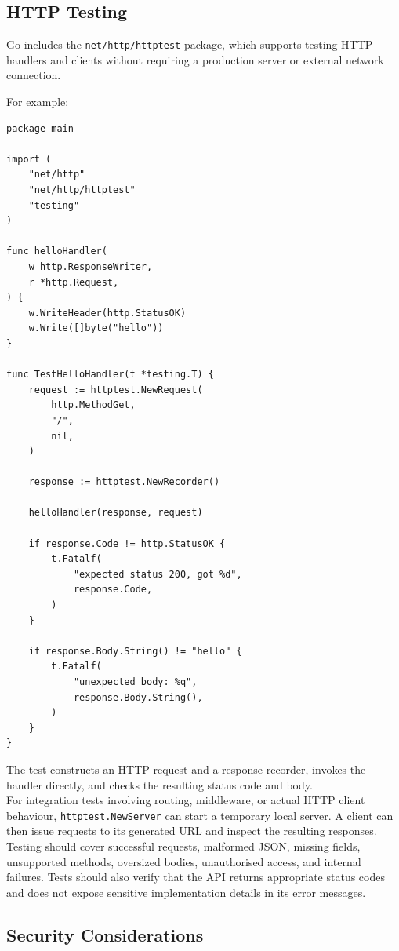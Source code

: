 \subsection{HTTP Testing}

Go includes the \texttt{net/http/httptest} package, which supports testing HTTP handlers and clients without requiring a production server or external network connection.

For example:

\begin{lstlisting}
package main

import (
    "net/http"
    "net/http/httptest"
    "testing"
)

func helloHandler(
    w http.ResponseWriter,
    r *http.Request,
) {
    w.WriteHeader(http.StatusOK)
    w.Write([]byte("hello"))
}

func TestHelloHandler(t *testing.T) {
    request := httptest.NewRequest(
        http.MethodGet,
        "/",
        nil,
    )

    response := httptest.NewRecorder()

    helloHandler(response, request)

    if response.Code != http.StatusOK {
        t.Fatalf(
            "expected status 200, got %d",
            response.Code,
        )
    }

    if response.Body.String() != "hello" {
        t.Fatalf(
            "unexpected body: %q",
            response.Body.String(),
        )
    }
}
\end{lstlisting}

The test constructs an HTTP request and a response recorder, invokes the handler directly, and checks the resulting status code and body.\\

For integration tests involving routing, middleware, or actual HTTP client behaviour, \texttt{httptest.NewServer} can start a temporary local server. A client can then issue requests to its generated URL and inspect the resulting responses.\\

Testing should cover successful requests, malformed JSON, missing fields, unsupported methods, oversized bodies, unauthorised access, and internal failures. Tests should also verify that the API returns appropriate status codes and does not expose sensitive implementation details in its error messages.\\

\subsection{Security Considerations}

